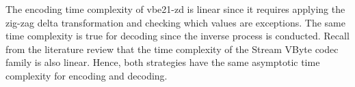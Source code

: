 The encoding time complexity of vbe21-zd is linear since it requires
applying the zig-zag delta transformation and checking which values are
exceptions. The same time complexity is true for decoding since the inverse
process is conducted. Recall from
the literature review
that the time complexity of the Stream VByte codec family is also linear. Hence,
both strategies have the same asymptotic time complexity for encoding and
decoding.

%




